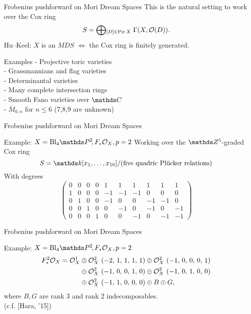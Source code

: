 \documentclass[beamer]{paper}
\def\OO{\mathcal{O}}
\begin{document}
\begin{frame}{Frobenius pushforward on Mori Dream Spaces}
  This is the natural setting to work over the Cox ring
  \[ S = \bigoplus\!{}_{[D]\in\Pic{X}} \; \Gamma(X, \OO(D)). \]
  Hu--Keel: $X$ is an $MDS$ $\iff$ the Cox ring is finitely generated.

  \vfill
  \begin{exampleblock}{Examples}
  \; - Projective toric varieties \\
  \; - Grassmannians and flag varieties \\
  \; - Determinantal varieties \\
  \; - Many complete intersection rings \\
  \; - Smooth Fano varieties over $\CC$ \\
  \; - $\overline{M}_{0,n}$ for $n\leq 6$ (7,8,9 are unknown)
  \end{exampleblock}
\end{frame}

\begin{frame}{Frobenius pushforward on Mori Dream Spaces}
  \begin{block}{Example: $X = \mathrm{Bl}_4\PP2, F_*\o_X, p = 2$}
    Working over the $\ZZ^5$-graded Cox ring \vspace*{-0.15in}
    \[ S = \kk[x_1,\dots,x_{10}]/\text{(five quadric Pl\"ucker relations)} \]
    With degrees \vspace*{-0.15in}
    \[
    \left(\!\begin{array}{cccccccccc}
      0&0&0&0&1&1&1&1&1&1 \\
      1&0&0&0&-1&-1&-1&0&0&0 \\
      0&1&0&0&-1&0&0&-1&-1&0 \\
      0&0&1&0&0&-1&0&-1&0&-1 \\
      0&0&0&1&0&0&-1&0&-1&-1
    \end{array}\!\right)
    \]
  \end{block}
\end{frame}


\begin{frame}{Frobenius pushforward on Mori Dream Spaces}
  \begin{block}{Example: $X = \mathrm{Bl}_4\PP2, F_*\o_X, p = 2$}
    \vspace*{-0.15in}
    \begin{align*}
      F_*^2\o_X = {\o_{X}^{1}}
      &\oplus {\o_{X}^{2}\ \left(-2,\,1,\,1,\,1,\,1\right)} \oplus {\o_{X}^{2}\ \left(-1,\,0,\,0,\,0,\,1\right)} \\ 
      &\oplus {\o_{X}^{2}\ \left(-1,\,0,\,0,\,1,\,0\right)} \oplus {\o_{X}^{2}\ \left(-1,\,0,\,1,\,0,\,0\right)} \\
      &\oplus {\o_{X}^{2}\ \left(-1,\,1,\,0,\,0,\,0\right)} \oplus B \oplus G,
    \end{align*}
    where $B, G$ are rank 3 and rank 2 indecomposables. \\
    \hfill (c.f. [Hara, '15])
  \end{block}
\end{frame}
\end{document}
